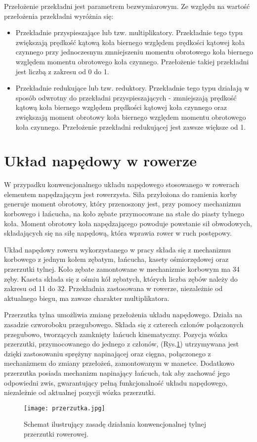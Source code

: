 Przełożenie przekładni jest parametrem bezwymiarowym. Ze względu na wartość przełożenia przekładni wyróżnia się:
\begin{itemize}
\item
Przekładnie przyspieszające lub tzw. multiplikatory. Przekładnie tego typu zwiększają prędkość kątową koła biernego względem prędkości kątowej koła czynnego przy jednoczesnym zmniejszeniu momentu obrotowego koła biernego względem momentu obrotowego koła czynnego. Przełożenie takiej przekładni jest liczbą z zakresu od 0 do 1.
\item
Przekładnie redukujące lub tzw. reduktory. Przekładnie tego typu działają w sposób odwrotny do przekładni przyspieszających - zmniejszają prędkość kątową koła biernego względem prędkości kątowej koła czynnego oraz zwiększają moment obrotowy koła biernego względem momentu obrotowego koła czynnego. Przełożenie przekładni redukującej jest zawsze większe od 1.
\end{itemize} 
\section{Układ napędowy w rowerze}
W przypadku konwencjonalnego układu napędowego stosowanego w rowerach elementem napędzającym jest rowerzysta. Siła przyłożona do ramienia korby generuje moment obrotowy, który przenoszony jest, przy pomocy mechanizmu korbowego i łańcucha, na koło zębate przymocowane na stałe do piasty tylnego koła. Moment obrotowy koła napędzającego powoduje powstanie sił obwodowych, składających się na siłę napędową, która wprawia rower w ruch postępowy.

Układ napędowy roweru wykorzystanego w pracy składa się z mechanizmu korbowego z jednym kołem zębatym, łańcucha, kasety ośmiorzędowej oraz przerzutki tylnej. Koło zębate zamontowane w mechanizmie korbowym ma 34 zęby. Kaseta składa się z ośmiu kół zębatych, których liczba zębów należy do zakresu od 11 do 32. Przekładnia zastosowana w rowerze, niezależnie od aktualnego biegu, ma zawsze charakter multiplikatora.

Przerzutka tylna umożliwia zmianę przełożenia układu napędowego. Działa na zasadzie czworoboku przegubowego. Składa się z czterech członów połączonych przegubowo, tworzących zamknięty łańcuch kinematyczny. Pozycja wózka przerzutki, przymocowanego do jednego z członów, (Rys.\ref{fig:przerzutka}) utrzymywana jest dzięki zastosowaniu sprężyny napinającej oraz cięgna, połączonego z mechanizmem do zmiany przełożeń, zamontowanym w manetce. Dodatkowo przerzutka posiada mechanizm napinający łańcuch, tak aby zachować jego odpowiedni zwis, gwarantujący pełną funkcjonalność układu napędowego, niezależnie od aktualnej pozycji wózka przerzutki. 
\begin{figure}[h]
    \centering
    \texttt{[image: przerzutka.jpg]}
    \caption{Schemat ilustrujący zasadę działania konwencjonalnej tylnej przerzutki rowerowej.}
    \label{fig:przerzutka}
\end{figure}

